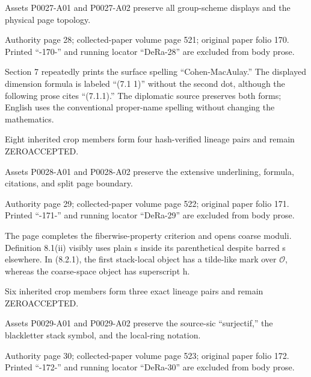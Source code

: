 \documentclass[11pt,a4paper]{article}
\begin{document}
Assets P0027-A01 and P0027-A02 preserve all group-scheme displays and the physical page topology.


\par\medskip
\hypertarget{D018-P0028}{}
\par\smallskip
Authority page 28; collected-paper volume page 521; original paper folio 170. Printed “-170-” and running locator “DeRa-28” are excluded from body prose.

Section 7 repeatedly prints the surface spelling “Cohen-MacAulay.” The displayed dimension formula is labeled “(7.1 1)” without the second dot, although the following prose cites “(7.1.1).” The diplomatic source preserves both forms; English uses the conventional proper-name spelling without changing the mathematics.

Eight inherited crop members form four hash-verified lineage pairs and remain ZERO\textunderscore{}ACCEPTED.

Assets P0028-A01 and P0028-A02 preserve the extensive underlining, formula, citations, and split page boundary.


\par\medskip
\hypertarget{D018-P0029}{}
\par\smallskip
Authority page 29; collected-paper volume page 522; original paper folio 171. Printed “-171-” and running locator “DeRa-29” are excluded from body prose.

The page completes the fiberwise-property criterion and opens coarse moduli. Definition 8.1(ii) visibly uses plain s inside its parenthetical despite barred s elsewhere. In (8.2.1), the first stack-local object has a tilde-like mark over \ensuremath{\mathcal{O}}, whereas the coarse-space object has superscript h.

Six inherited crop members form three exact lineage pairs and remain ZERO\textunderscore{}ACCEPTED.

Assets P0029-A01 and P0029-A02 preserve the source-sic “surjectif,” the blackletter stack symbol, and the local-ring notation.


\par\medskip
\hypertarget{D018-P0030}{}
\par\smallskip
Authority page 30; collected-paper volume page 523; original paper folio 172. Printed “-172-” and running locator “DeRa-30” are excluded from body prose.
\end{document}
